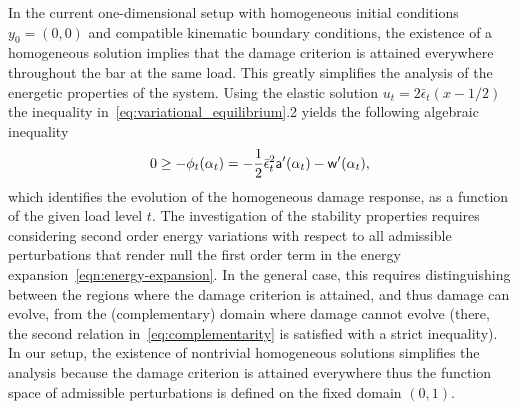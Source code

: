 In the current one-dimensional setup with homogeneous initial conditions $y_0=(0, 0)$ and compatible kinematic boundary conditions, the existence of a homogeneous solution implies that the damage criterion is attained everywhere throughout the bar at the same load. This greatly simplifies the analysis of the energetic properties of the system.
Using the elastic solution $u_t = 2\bar \epsilon_t(x-1/2)$
the inequality in~\eqref{eq:variational_equilibrium}.2 yields the following algebraic inequality
\begin{equation}
    \label{eq:variational_equilibrium_homogeneous}
    0 \geq -\phi_t(\alpha_t)= -\frac{1}{2}\bar \epsilon_t^2 \mathsf{a}'(\alpha_t)-\mathsf{w}'(\alpha_t),
\end{equation}
which identifies the evolution of the homogeneous damage response, as a function of the given load level $t$.
The investigation of the stability properties requires
considering second order energy variations with respect to all admissible perturbations that render null the first order term in the energy expansion~\eqref{eqn:energy-expansion}.
In the general case, this requires distinguishing between the regions where the damage criterion is attained, and thus damage can evolve, from the (complementary) domain where damage cannot evolve (there, the second relation in~\eqref{eq:complementarity} is satisfied with a strict inequality).
In our setup, the existence of nontrivial homogeneous solutions simplifies the analysis because the damage criterion is attained everywhere thus  the function space of admissible perturbations is defined on the fixed domain $(0, 1)$.



